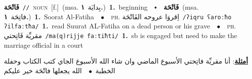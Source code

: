 \documentclass[10pt,a4paper,twoside]{article} %
\begin{document}
\begin{multicols}{2}
{{{\setlength\topsep{0pt}\textbf{\foreignlanguage{arabic}{فَاتْحَة}}\ {\color{gray}\texttt{//}\color{black}}\ \textsc{noun}\ [f.]\ \color{gray}(msa. \foreignlanguage{arabic}{بِدايَة}~\foreignlanguage{arabic}{\textbf{١.}})\color{black}\ \textbf{1.}~beginning\ \ $\smblkdiamond$\ \ \setlength\topsep{0pt}\textbf{\foreignlanguage{arabic}{فَاتْحَة}}\ \color{gray}(msa. \foreignlanguage{arabic}{فاتِحَة}~\foreignlanguage{arabic}{\textbf{١.}})\color{black}\ \textbf{1.}~Soorat Al-Fatiha\ \ $\bullet$\ \ \textsc{ph.} \color{gray} \foreignlanguage{arabic}{اِقروَا عروحه الفَاتْحَة}\color{black}\ {\color{gray}\texttt{/{\sffamily ʔiqru ʕaroːħo ʔilfaːtħa}/}\color{black}}\ \textbf{1.}~read Suurat AL-Fatiha on a dead person or his grave\ \ $\bullet$\ \ \textsc{ph.} \color{gray} \foreignlanguage{arabic}{مقريِّة فَاتِحتي}\color{black}\ {\color{gray}\texttt{/{\sffamily ma(q)rijje faːtiħti}/}\color{black}}\ \textbf{1.}~sb is engaged but need to make the marriage official in a court\  \begin{flushright}\color{gray}\foreignlanguage{arabic}{\textbf{\underline{\foreignlanguage{arabic}{أمثلة}}}: أنا مقريِّة فاتِحتي الأسبوع الماضي وان شاء الله الأسبوع الجاي كتب الكتاب وحفلة الخطبة\ $\bullet$\ \  الله يجعلها فاتْحَة خير عليكم}\end{flushright}\color{black}} \vspace{2mm}

}}
\end{multicols}
\end{document}
